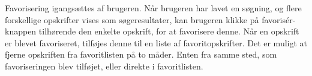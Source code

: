 {Favorisering igangsættes af brugeren. Når brugeren har lavet en søgning, og flere forskellige opskrifter vises som søgeresultater, kan brugeren klikke på favorisér-knappen tilhørende den enkelte opskrift, for at favorisere denne. Når en opskrift er blevet favoriseret, tilføjes denne til en liste af favoritopskrifter. Det er muligt at fjerne opskriften fra favoritlisten på to måder. Enten fra samme sted, som favoriseringen blev tilføjet, eller direkte i favoritlisten.}
{}
{}
